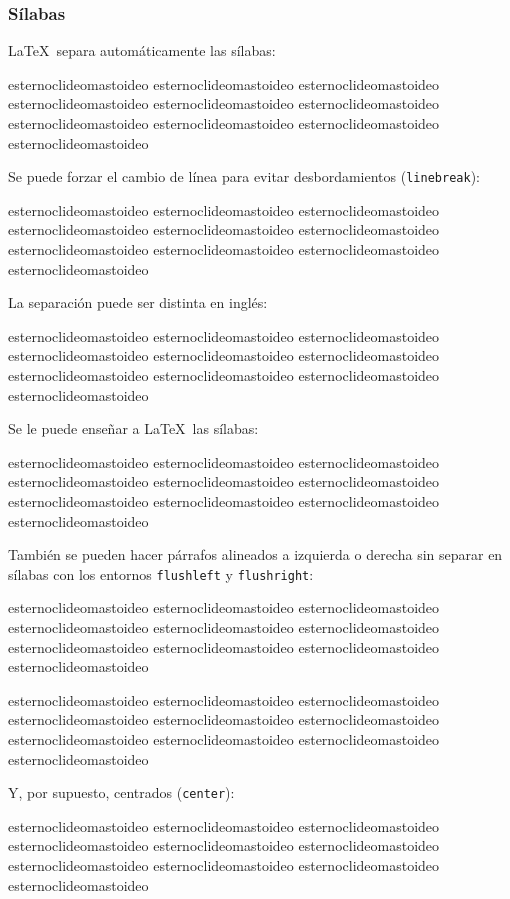 \documentclass[12pt]{article}
\begin{document}
	\subsubsection{Sílabas} 
	\LaTeX\ separa automáticamente las sílabas: 
	\par
	esternoclideomastoideo esternoclideomastoideo esternoclideomastoideo esternoclideomastoideo esternoclideomastoideo esternoclideomastoideo esternoclideomastoideo esternoclideomastoideo esternoclideomastoideo esternoclideomastoideo 
	\par\bigskip\noindent
	Se puede forzar el cambio de línea para evitar desbordamientos (\texttt{linebreak}):
	\par
	esternoclideomastoideo esternoclideomastoideo esternoclideomastoideo \linebreak esternoclideomastoideo esternoclideomastoideo esternoclideomastoideo esternoclideomastoideo esternoclideomastoideo esternoclideomastoideo esternoclideomastoideo 
	\par\bigskip\noindent
	La separación puede ser distinta en inglés: 
	\par
	esternoclideomastoideo esternoclideomastoideo esternoclideomastoideo esternoclideomastoideo esternoclideomastoideo esternoclideomastoideo esternoclideomastoideo esternoclideomastoideo esternoclideomastoideo esternoclideomastoideo 
	\par\bigskip\noindent
	Se le puede enseñar a \LaTeX\ las sílabas:
	\par
	es\-ter\-no\-cli\-deo\-mas\-toi\-de\-o es\-ter\-no\-cli\-deo\-mas\-toi\-de\-o es\-ter\-no\-cli\-deo\-mas\-toi\-de\-o es\-ter\-no\-cli\-deo\-mas\-toi\-de\-o es\-ter\-no\-cli\-deo\-mas\-toi\-de\-o es\-ter\-no\-cli\-deo\-mas\-toi\-de\-o es\-ter\-no\-cli\-deo\-mas\-toi\-de\-o es\-ter\-no\-cli\-deo\-mas\-toi\-de\-o es\-ter\-no\-cli\-deo\-mas\-toi\-de\-o es\-ter\-no\-cli\-deo\-mas\-toi\-de\-o 
	\par\bigskip\noindent
	También se pueden hacer párrafos alineados a izquierda o derecha sin separar en sílabas con los entornos \texttt{flushleft} y \texttt{flushright}:
	\begin{flushleft}
		esternoclideomastoideo esternoclideomastoideo esternoclideomastoideo esternoclideomastoideo esternoclideomastoideo esternoclideomastoideo esternoclideomastoideo esternoclideomastoideo esternoclideomastoideo esternoclideomastoideo 
	\end{flushleft}
	\begin{flushright}
		esternoclideomastoideo esternoclideomastoideo esternoclideomastoideo esternoclideomastoideo esternoclideomastoideo esternoclideomastoideo esternoclideomastoideo esternoclideomastoideo esternoclideomastoideo esternoclideomastoideo 
	\end{flushright}
	Y, por supuesto, centrados (\texttt{center}):
	\begin{center}
		esternoclideomastoideo esternoclideomastoideo esternoclideomastoideo esternoclideomastoideo esternoclideomastoideo esternoclideomastoideo esternoclideomastoideo esternoclideomastoideo esternoclideomastoideo esternoclideomastoideo 
	\end{center}
\end{document}

